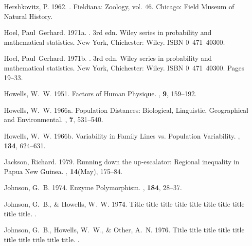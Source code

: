\begin{thebibliography}{}
Hershkovitz, P. 1962.
.
\newblock Fieldiana: Zoology, vol. 46.
\newblock Chicago: Field Museum of Natural History.

Hoel, Paul~Gerhard. 1971a.
. 3rd edn.
\newblock Wiley series in probability and mathematical statistics.
\newblock New York, Chichester: Wiley.
\newblock ISBN 0~471~40300.

Hoel, Paul~Gerhard. 1971b.
. 3rd edn.
\newblock Wiley series in probability and mathematical statistics.
\newblock New York, Chichester: Wiley.
\newblock ISBN 0~471~40300.
\newblock Pages  19--33.

Howells, W.~W. 1951.
\newblock Factors of Human Physique.
, {\bf 9}, 159--192.

Howells, W.~W. 1966a.
\newblock Population Distances: Biological, Linguistic, Geographical and
  Environmental.
, {\bf 7}, 531--540.

Howells, W.~W. 1966b.
\newblock Variability in Family Lines vs. Population Variability.
, {\bf 134},
  624--631.

Jackson, Richard. 1979.
\newblock Running down the up-escalator: Regional inequality in {Papua New
  Guinea}.
, {\bf 14}(May), 175--84.

Johnson, G.~B. 1974.
\newblock Enzyme Polymorphism.
, {\bf 184}, 28--37.

Johnson, G.~B., \& Howells, W.~W. 1974.
\newblock Title title title title title title title title title title.
.

Johnson, G.~B., Howells, W.~W., \& Other, A.~N. 1976.
\newblock Title title title title title title title title title title.
.


\end{thebibliography}
